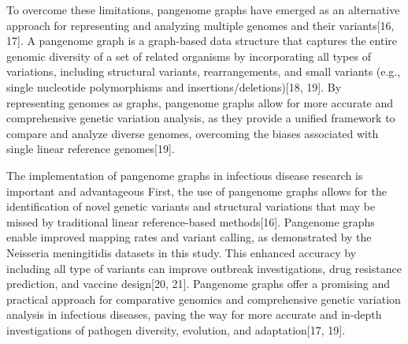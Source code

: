 To overcome these limitations, pangenome graphs have emerged as an alternative approach for representing and analyzing multiple genomes and their variants[16, 17]. A pangenome graph is a graph-based data structure that captures the entire genomic diversity of a set of related organisms by incorporating all types of variations, including structural variants, rearrangements, and small variants (e.g., single nucleotide polymorphisms and insertions/deletions)[18, 19]. By representing genomes as graphs, pangenome graphs allow for more accurate and comprehensive genetic variation analysis, as they provide a unified framework to compare and analyze diverse genomes, overcoming the biases associated with single linear reference genomes[19].

The implementation of pangenome graphs in infectious disease research is important and advantageous First, the use of pangenome graphs allows for the identification of novel genetic variants and structural variations that may be missed by traditional linear reference-based methods[16]. Pangenome graphs enable improved mapping rates and variant calling, as demonstrated by the Neisseria meningitidis datasets in this study. This enhanced accuracy by including all type of variants can improve outbreak investigations, drug resistance prediction, and vaccine design[20, 21]. Pangenome graphs offer a promising and practical approach for comparative genomics and comprehensive genetic variation analysis in infectious diseases, paving the way for more accurate and in-depth investigations of pathogen diversity, evolution, and adaptation[17, 19].

